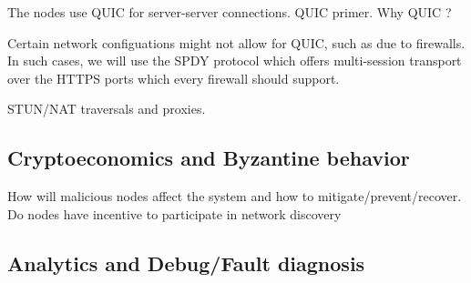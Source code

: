 The nodes use QUIC for server-server connections. QUIC primer. Why QUIC ?

Certain network configuations might not allow for QUIC, such as due to firewalls. In such cases, we will use the SPDY
protocol which offers multi-session transport over the HTTPS ports which every firewall should support.

STUN/NAT traversals and proxies.

\subsection{Cryptoeconomics and Byzantine behavior}
How will malicious nodes affect the system and how to mitigate/prevent/recover. Do nodes have incentive to participate in network discovery

\subsection{Analytics and Debug/Fault diagnosis}
